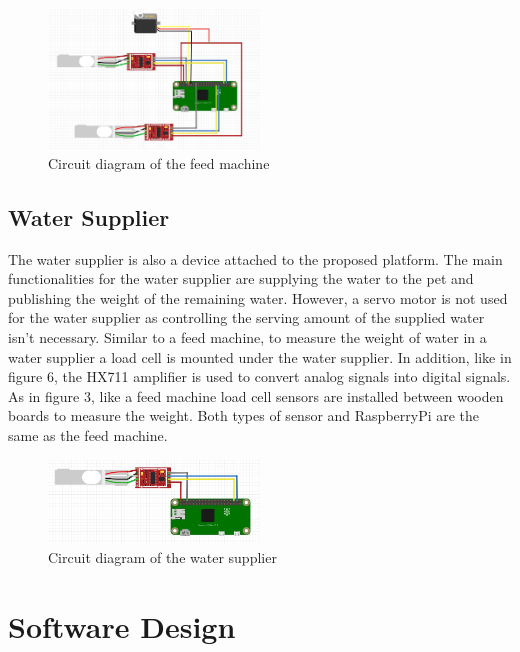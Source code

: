 \documentclass[conference]{IEEEtran}
\begin{document}
\begin{figure}[htbp]
\centerline{\includegraphics[width=0.5\textwidth]{./images/feed machine circuit.jpg}}
\caption{Circuit diagram of the feed machine}
\label{fig}
\end{figure}

\subsection{Water Supplier}
The water supplier is also a device attached to the proposed platform. The main functionalities for the water supplier are supplying the water to the pet and publishing the weight of the remaining water. However, a servo motor is not used for the water supplier as controlling the serving amount of the supplied water isn’t necessary. Similar to a feed machine, to measure the weight of water in a water supplier a load cell is mounted under the water supplier. In addition, like in figure 6, the HX711 amplifier is used to convert analog signals into digital signals. As in figure 3, like a feed machine load cell sensors are installed between wooden boards to measure the weight. Both types of sensor and RaspberryPi are the same as the feed machine. 

\begin{figure}[htbp]
\centerline{\includegraphics[width=0.5\textwidth]{./images/water supplier circuit.jpg}}
\caption{Circuit diagram of the water supplier}
\label{fig}
\end{figure}

\section{Software Design}
\end{document}

